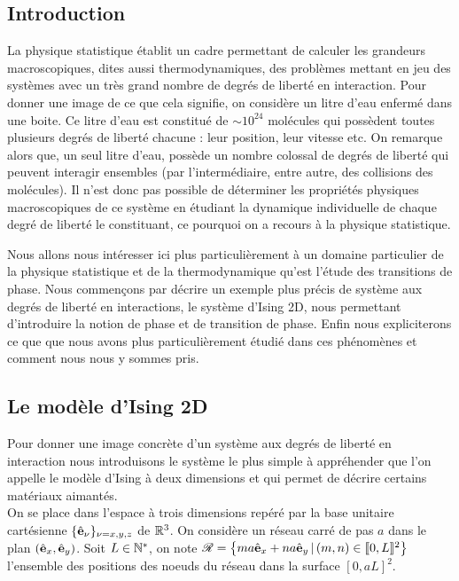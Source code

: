 \documentclass[10.5pt]{article}
\begin{document}
\pagebreak
\begin{multicols*}{2}

\section{Introduction}


La physique statistique établit un cadre permettant de calculer les grandeurs macroscopiques, dites aussi thermodynamiques, des problèmes mettant en jeu des systèmes avec un très grand nombre de degrés de liberté en interaction. Pour donner une image de ce que cela signifie, on considère un litre d'eau enfermé dans une boite. Ce litre d'eau est constitué de $\sim 10^{24}$ molécules qui possèdent toutes plusieurs degrés de liberté chacune : leur position, leur vitesse etc. On remarque alors que, un seul litre d'eau, possède un nombre colossal de degrés de liberté qui peuvent interagir ensembles (par l'intermédiaire, entre autre, des collisions des molécules). Il n'est donc pas possible de déterminer les propriétés physiques macroscopiques de ce système en étudiant la dynamique individuelle de chaque degré de liberté le constituant, ce pourquoi on a recours à la physique statistique. 

Nous allons nous intéresser ici plus particulièrement à un domaine particulier de la physique statistique et de la thermodynamique qu'est l'étude des transitions de phase. Nous commençons par décrire un exemple plus précis de système aux degrés de liberté en interactions, le système d'Ising 2D, nous permettant d'introduire la notion de phase et de transition de phase. Enfin nous expliciterons ce que que nous avons plus particulièrement étudié dans ces phénomènes et comment nous nous y sommes pris. \\




\subsection{Le modèle d'Ising 2D}


\label{sec:IsingIntro}

Pour donner une image concrète d'un système aux degrés de liberté en interaction nous introduisons le système le plus simple à appréhender que l'on appelle le modèle d'Ising à deux dimensions et qui permet de décrire certains matériaux aimantés. \\

On se place dans l'espace à trois dimensions repéré par la base unitaire cartésienne $\{\hat{\mathbf{e}}_\nu\}_{\nu=x,y,z}$ de $\mathbb{R}^3$. On considère un réseau carré de pas $a$ dans le plan $(\hat{\mathbf{e}}_x, \hat{\mathbf{e}}_y)$. Soit $L \in \mathbb{N}^*$, on note $\mathscr{R} = \left\{ m a \hat{\mathbf{e}}_x + n a \hat{\mathbf{e}}_y \, | \, (m, n) \in   \llbracket 0,L \rrbracket ^2 \right\}$ l'ensemble des positions des noeuds du réseau dans la surface $[0, aL]^2$.  


\end{multicols*}
\end{document}
